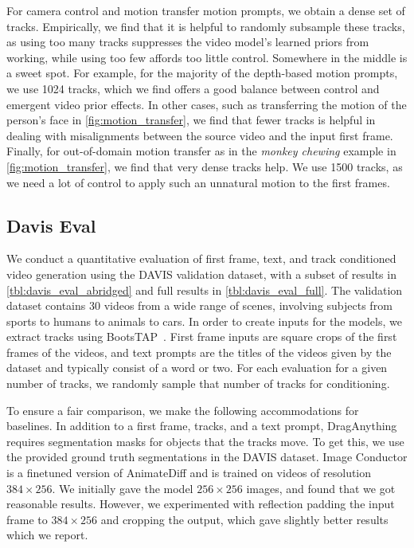 For camera control and motion transfer motion prompts, we obtain a dense set of tracks. Empirically, we find that it is helpful to randomly subsample these tracks, as using too many tracks suppresses the video model's learned priors from working, while using too few affords too little control. Somewhere in the middle is a sweet spot. For example, for the majority of the depth-based motion prompts, we use 1024 tracks, which we find offers a good balance between control and emergent video prior effects. In other cases, such as transferring the motion of the person's face in \cref{fig:motion_transfer}, we find that fewer tracks is helpful in dealing with misalignments between the source video and the input first frame. Finally, for out-of-domain motion transfer as in the {\it monkey chewing} example in \cref{fig:motion_transfer}, we find that very dense tracks help. We use 1500 tracks, as we need a lot of control to apply such an unnatural motion to the first frames.

\subsection{Davis Eval}
We conduct a quantitative evaluation of first frame, text, and track conditioned video generation using the DAVIS validation dataset, with a subset of results in \cref{tbl:davis_eval_abridged} and full results in \cref{tbl:davis_eval_full}. The validation dataset contains 30 videos from a wide range of scenes, involving subjects from sports to humans to animals to cars. In order to create inputs for the models, we extract tracks using BootsTAP~\cite{doersch2024bootstap}. First frame inputs are square crops of the first frames of the videos, and text prompts are the titles of the videos given by the dataset and typically consist of a word or two. For each evaluation for a given number of tracks, we randomly sample that number of tracks for conditioning.

To ensure a fair comparison, we make the following accommodations for baselines. In addition to a first frame, tracks, and a text prompt, DragAnything requires segmentation masks for objects that the tracks move. To get this, we use the provided ground truth segmentations in the DAVIS dataset. Image Conductor is a finetuned version of AnimateDiff and is trained on videos of resolution $384 \times 256$. We initially gave the model $256 \times 256$ images, and found that we got reasonable results. However, we experimented with reflection padding the input frame to $384 \times 256$ and cropping the output, which gave slightly better results which we report. 

